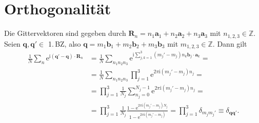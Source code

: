 \documentclass[english, parskip=full]{scrartcl}
\renewcommand{\i}{\text{i}}
\newcommand{\e}{\text{e}}
\begin{document}
\section{Orthogonalität}
Die Gittervektoren sind gegeben durch $\textbf{R}_n = n_1\textbf{a}_1 + n_2\textbf{a}_2 + n_3\textbf{a}_3$ mit $n_{1,2,3}\in\mathbb{Z}$.
Seien $\mathbf{q},\mathbf{q}'\in$ 1.\,BZ, also $\mathbf{q} = m_1\textbf{b}_1 + m_2\textbf{b}_2 + m_3\textbf{b}_3$ mit $m_{1,2,3}\in\mathbb{Z}$.
Dann gilt
\begin{align}
\frac{1}{N}\sum_n \e^{\i (\textbf{q}' - \textbf{q})\cdot \textbf{R}_n} &= \frac{1}{N}\sum_{n_1n_2n_3} \e^{\i \sum_{j,k=1}^3 (m_j'-m_j)n_k \textbf{b}_j\cdot \textbf{a}_k} = \\
&= \frac{1}{N}\sum_{n_1n_2n_3} \prod_{j=1}^3 \e^{2\pi\i (m_j'-m_j)n_j} = \\
&= \prod_{j=1}^3 \frac{1}{N_j} \sum_{n_j=0}^{N_j-1} \e^{2\pi\i (m_j'-m_j)n_j} = \\
&= \prod_{j=1}^3 \frac{1}{N_j} \frac{1 - \e^{2\pi\i (m_j'-m_j)N_j}}{1 - \e^{2\pi\i (m_j' - m_j)}} = \prod_{j=1}^3 \delta_{m_jm_j'} \equiv \delta_{\textbf{q}\textbf{q}'}.
\end{align}
\end{document}
